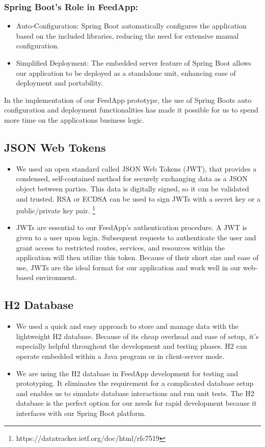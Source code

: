\subsubsection{Spring Boot's Role in FeedApp:}
\begin{itemize}
    \item Auto-Configuration: Spring Boot automatically configures the application based on the included libraries, reducing the need for extensive manual configuration.
    \item Simplified Deployment: The embedded server feature of Spring Boot allows our application to be deployed as a standalone unit, enhancing ease of deployment and portability.
\end{itemize}

In the implementation of our FeedApp prototype, the use of Spring Boots auto configuration and deployment functionalities has made it possible for us to spend more time on the applications business logic. 

\subsection{JSON Web Tokens}
\begin{itemize}
 \item We used an open standard called JSON Web Tokens (JWT), that provides a condensed, self-contained method for securely exchanging data as a JSON object between parties. This data is digitally signed, so it can be validated and trusted. RSA or ECDSA can be used to sign JWTs with a secret key or a public/private key pair. \footnote{https://datatracker.ietf.org/doc/html/rfc7519}
 \item JWTs are essential to our FeedApp's authentication procedure. A JWT is given to a user upon login. Subsequent requests to authenticate the user and grant access to restricted routes, services, and resources within the application will then utilize this token. Because of their short size and ease of use, JWTs are the ideal format for our application and work well in our web-based environment.
\end{itemize}

\subsection{H2 Database}
\begin{itemize}
 \item We used a quick and easy approach to store and manage data with the lightweight H2 database. Because of its cheap overhead and ease of setup, it's especially helpful throughout the development and testing phases. H2 can operate embedded within a Java program or in client-server mode.
 \item We are using the H2 database in FeedApp development for testing and prototyping. It eliminates the requirement for a complicated database setup and enables us to simulate database interactions and run unit tests. The H2 database is the perfect option for our needs for rapid development because it interfaces with our Spring Boot platform.
\end{itemize}

